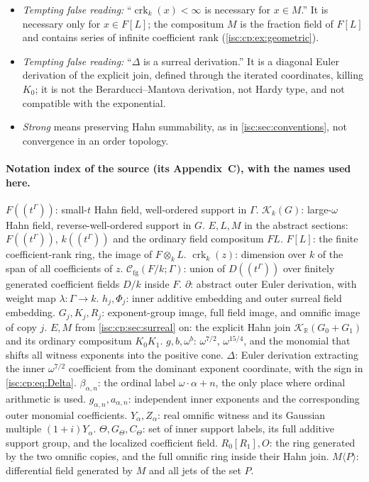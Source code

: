 \documentclass[11pt,letterpaper]{article}
\theoremstyle{definition}
\theoremstyle{remark}
\newcommand{\R}{\mathbb R}
\newcommand{\K}[2]{\mathcal K_{#1}(#2)}
\newcommand{\crk}{\operatorname{crk}}%
\newcommand{\Cfg}{\mathcal C_{\mathrm{fg}}}
\numberwithin{equation}{section}
\begin{document}
\begin{itemize}[leftmargin=*,itemsep=3pt]
map.
\item \emph{Tempting false reading:} ``$\crk_k(x)<\infty$ is necessary for
$x\in M$.'' It is necessary only for $x\in F[L]$; the compositum $M$ is the
fraction field of $F[L]$ and contains series of infinite coefficient rank
(\cref{isc:cp:ex:geometric}).
\item \emph{Tempting false reading:} ``$\Delta$ is a surreal derivation.''
It is a diagonal Euler derivation of the explicit join, defined through the
iterated coordinates, killing $K_0$; it is not the Berarducci--Mantova
derivation, not Hardy type, and not compatible with the exponential.
\item \emph{Strong} means preserving Hahn summability, as in
\cref{isc:sec:conventions}, not convergence in an order topology.
\end{itemize}

\paragraph{Notation index of the source (its Appendix~C), with the names
used here.} $F((t^\Gamma))$: small-$t$ Hahn field, well-ordered support in
$\Gamma$. $\K{k}{G}$: large-$\omega$ Hahn field, reverse-well-ordered
support in $G$. $E,L,M$ in the abstract sections: $F((t^\Gamma))$,
$k((t^\Gamma))$ and the ordinary field compositum $FL$. $F[L]$: the finite
coefficient-rank ring, the image of $F\otimes_kL$. $\crk_k(z)$: dimension
over $k$ of the span of all coefficients of $z$. $\Cfg(F/k;\Gamma)$: union
of $D((t^\Gamma))$ over finitely generated coefficient fields $D/k$ inside
$F$. $\partial$: abstract outer Euler derivation, with weight map
$\lambda:\Gamma\to k$. $h_j,\Phi_j$: inner additive embedding and outer
surreal field embedding. $G_j,K_j,R_j$: exponent-group image, full field
image, and omnific image of copy $j$. $E,M$ from \cref{isc:cp:sec:surreal}
on: the explicit Hahn join $\K{\R}{G_0+G_1}$ and its ordinary compositum
$K_0K_1$. $g,b,\omega^b$: $\omega^{7/2}$, $\omega^{15/4}$, and the monomial
that shifts all witness exponents into the positive cone. $\Delta$: Euler
derivation extracting the inner $\omega^{7/2}$ coefficient from the
dominant exponent coordinate, with the sign in \eqref{isc:cp:eq:Delta}.
$\beta_{\alpha,n}$: the ordinal label $\omega\cdot\alpha+n$, the only place
where ordinal arithmetic is used. $g_{\alpha,n},a_{\alpha,n}$: independent
inner exponents and the corresponding outer monomial coefficients.
$Y_\alpha,Z_\alpha$: real omnific witness and its Gaussian multiple
$(1+i)Y_\alpha$. $\Theta,G_\Theta,C_\Theta$: set of inner support labels,
its full additive support group, and the localized coefficient field.
$R_0[R_1],O$: the ring generated by the two omnific copies, and the full
omnific ring inside their Hahn join. $M\langle P\rangle$: differential field
generated by $M$ and all jets of the set $P$.
\end{document}
